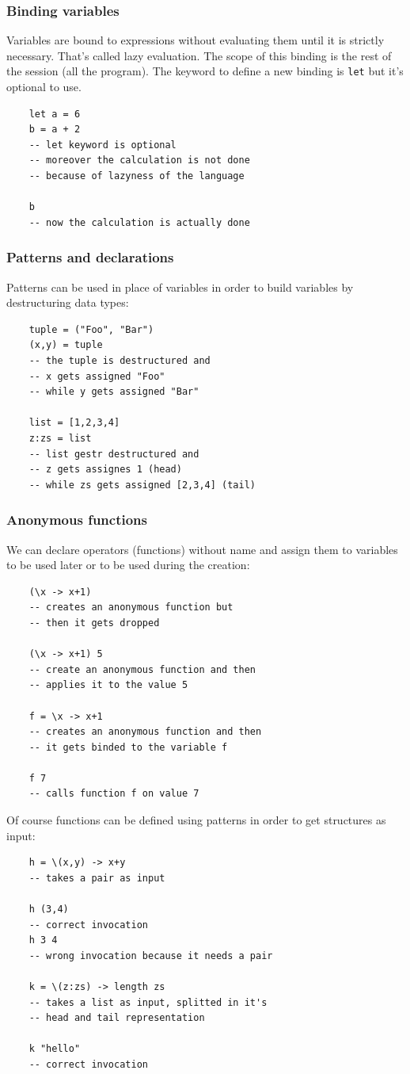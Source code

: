 \subsubsection{Binding variables}
Variables are bound to expressions without evaluating them until it is strictly necessary.
That's called lazy evaluation.
The scope of this binding is the rest of the session (all the program).
The keyword to define a new binding is \verb|let| but it's optional to use.
\begin{verbatim}
    let a = 6
    b = a + 2
    -- let keyword is optional
    -- moreover the calculation is not done
    -- because of lazyness of the language

    b
    -- now the calculation is actually done
\end{verbatim}

\subsubsection{Patterns and declarations}
Patterns can be used in place of variables in order to build variables by destructuring data types:
\begin{verbatim}
    tuple = ("Foo", "Bar")
    (x,y) = tuple
    -- the tuple is destructured and
    -- x gets assigned "Foo"
    -- while y gets assigned "Bar"

    list = [1,2,3,4]
    z:zs = list
    -- list gestr destructured and
    -- z gets assignes 1 (head)
    -- while zs gets assigned [2,3,4] (tail)
\end{verbatim}

\subsubsection{Anonymous functions}
We can declare operators (functions) without name and assign them to variables to be used later or to be used during the creation:
\begin{verbatim}
    (\x -> x+1)
    -- creates an anonymous function but
    -- then it gets dropped

    (\x -> x+1) 5
    -- create an anonymous function and then
    -- applies it to the value 5
    
    f = \x -> x+1
    -- creates an anonymous function and then
    -- it gets binded to the variable f

    f 7
    -- calls function f on value 7
\end{verbatim}

Of course functions can be defined using patterns in order to get structures as input:
\begin{verbatim}
    h = \(x,y) -> x+y
    -- takes a pair as input

    h (3,4)
    -- correct invocation
    h 3 4 
    -- wrong invocation because it needs a pair

    k = \(z:zs) -> length zs
    -- takes a list as input, splitted in it's
    -- head and tail representation

    k "hello"
    -- correct invocation
\end{verbatim}


